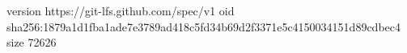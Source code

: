 version https://git-lfs.github.com/spec/v1
oid sha256:1879a1d1fba1ade7e3789ad418c5fd34b69d2f3371e5c4150034151d89cdbec4
size 72626
